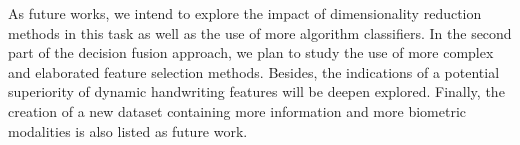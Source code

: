 \documentclass[conference]{IEEEtran}
\begin{document}
As future works, we intend to explore the impact of dimensionality reduction methods in this task as well as the use of more algorithm classifiers. In the second part of the decision fusion approach, we plan to study the use of more complex and elaborated feature selection methods. Besides, the indications of a potential superiority of dynamic handwriting features will be deepen explored.
Finally, the creation of a new dataset containing more information and more biometric modalities is also listed as future work.
 


\end{document}
